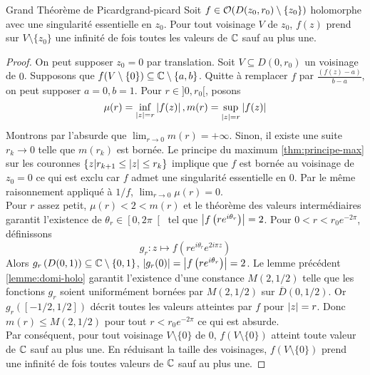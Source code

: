 \documentclass{cours}
\begin{document}
\begin{théorème}
	{Grand Théorème de Picard}{grand-picard}
	Soit $f \in \mathcal{O}(D(z_{0}, r_{0})\setminus \{z_{0}\})$ holomorphe avec une singularité essentielle en $z_{0}$. 
	Pour tout voisinage $V$ de $z_{0}$, $f(z)$ prend sur $V \setminus \{z_{0}\}$ une infinité de fois toutes les valeurs de $\mathbb{C}$ sauf au plus une. 
\end{théorème}
\begin{proof}
	On peut supposer $z_{0} = 0$ par translation. Soit $V \subseteq D(0, r_{0})$ un voisinage de $0$. 
	Supposons que $f(V \setminus \{0\}) \subseteq \mathbb{C} \setminus \{a, b\}$. 
	Quitte à remplacer $f$ par $\frac{\left(f(z) - a\right)}{b - a}$, on peut supposer $a = 0, b = 1$. 
	Pour $r \in ]0, r_{0}[$, posons
		\begin{equation*}
			\mu(r) = \inf_{\left|z\right| = r}\left|f(z)\right|, m(r) = \sup_{\left|z\right| = r}\left|f(z)\right|
		\end{equation*}
	Montrons par l'absurde que $\lim_{r \to 0} m(r) = +\infty$.
	Sinon, il existe une suite $r_{k} \to 0$ telle que $m(r_{k})$ est bornée. 
	Le principe du maximum \ref{thm:principe-max} sur les couronnes $\left\{z \middle| r_{k + 1} \leq \left|z\right|\leq r_{k}\right\}$ implique que $f$ est bornée au voisinage de $z_{0} = 0$ ce qui est exclu car $f$ admet une singularité essentielle en $0$.
	Par le même raisonnement appliqué à $1/f$, $\lim_{r \to 0} \mu(r) = 0$.\\
	Pour $r$ assez petit, $\mu(r) < 2 < m(r)$ et le théorème des valeurs intermédiaires garantit l'existence de $\theta_{r} \in \left[0, 2\pi\right[$ tel que $\left|f\left(re^{i\theta_{r}}\right)\right| = 2$.
	Pour $0 < r < r_{0}e^{-2\pi}$, définissons 
\begin{equation*}
	g_{r}: z \longmapsto f\left(re^{i\theta_{r}}e^{2i\pi z}\right)
\end{equation*}
	Alors $g_{r}\left(D(0, 1)\right) \subseteq \mathbb{C}\setminus \{0, 1\}$, $\left|g_{r}(0)\right| = \left|f\left(re^{i\theta_{r}}\right)\right| = 2$. 
	Le lemme précédent \ref{lemme:domi-holo} garantit l'existence d'une constance $M(2, 1/2)$ telle que les fonctions $g_{r}$ soient uniformément bornées par $M(2, 1/2)$ sur $\overline{D}(0, 1/2)$. 
	Or $g_{r}\left(\left[-1/2, 1/2\right]\right)$ décrit toutes les valeurs atteintes par $f$ pour $\left|z\right| = r$.
	Donc $m(r) \leq M(2, 1/2)$ pour tout $r < r_{0}e^{-2\pi}$ ce qui est absurde.\\
	Par conséquent, pour tout voisinage $V \setminus \{0\}$ de $0$, $f(V \setminus \{0\})$ atteint toute valeur de $\mathbb{C}$ sauf au plus une. 
	En réduisant la taille des voisinages, $f(V \setminus \{0\})$ prend une infinité de fois toutes valeurs de $\mathbb{C}$ sauf au plus une. 
\end{proof}
\end{document}
